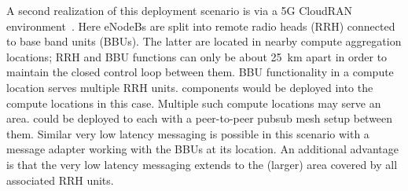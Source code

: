 A second realization of this deployment scenario is via a 5G CloudRAN
environment~\cite{checko2015cloud}. Here eNodeBs are split into remote radio
heads (RRH) connected to base band units (BBUs).  The latter are
located in nearby compute aggregation locations; RRH and BBU functions
can only be about 25~km apart in order to maintain the closed control
loop between them. BBU functionality in a compute location serves
multiple RRH units. \name{} components would be deployed into the
compute locations in this case.  Multiple such compute locations may
serve an area. \name{} could be deployed to each with a peer-to-peer
pubsub mesh setup between them.  Similar very low latency messaging is
possible in this scenario with a \name{} message adapter working with
the BBUs at its location.  An additional advantage is that the very
low latency messaging extends to the (larger) area covered by all
associated RRH units.
